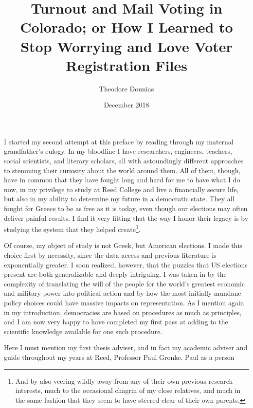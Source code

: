 \documentclass[12pt,twoside]{reedthesis}
\title{Turnout and Mail Voting in Colorado; or How I Learned to Stop Worrying
and Love Voter Registration Files}
\author{Theodore Dounias}
\date{December 2018}
\begin{document}
      \maketitle
  
  \frontmatter %
  \pagestyle{empty} %

  
      \begin{preface}
      I started my second attempt at this preface by reading through my
      maternal grandfather's eulogy. In my bloodline I have researchers,
      engineers, teachers, social scientists, and literary scholars, all with
      astoundingly different approaches to stemming their curiosity about the
      world around them. All of them, though, have in common that they have
      fought long and hard for me to have what I do now, in my privilege to
      study at Reed College and live a financially secure life, but also in my
      ability to determine my future in a democratic state. They all fought
      for Greece to be as free as it is today, even though our elections may
      often deliver painful results. I find it very fitting that the way I
      honor their legacy is by studying the system that they helped
      create\footnote{And by also veering wildly away from any of their own
        previous research interests, much to the occasional chagrin of my
        close relatives, and much in the same fashion that they seem to have
        steered clear of their own parents.}. \par Of course, my object of
      study is not Greek, but American elections. I made this choice first by
      necessity, since the data access and previous literature is
      exponentially greater. I soon realized, however, that the puzzles that
      US elections present are both generalizable and deeply intriguing. I was
      taken in by the complexity of translating the will of the people for the
      world's greatest economic and military power into political action and
      by how the most initially mundane policy choices could have massive
      impacts on representation. As I mention again in my introduction,
      democracies are based on procedures as much as principles, and I am now
      very happy to have completed my first pass at adding to the scientific
      knowledge available for one such procedure. \par Here I must mention my
      first thesis adviser, and in fact my academic adviser and guide
      throughout my years at Reed, Professor Paul Gronke. Paul as a person

\end{preface}
\end{document}
